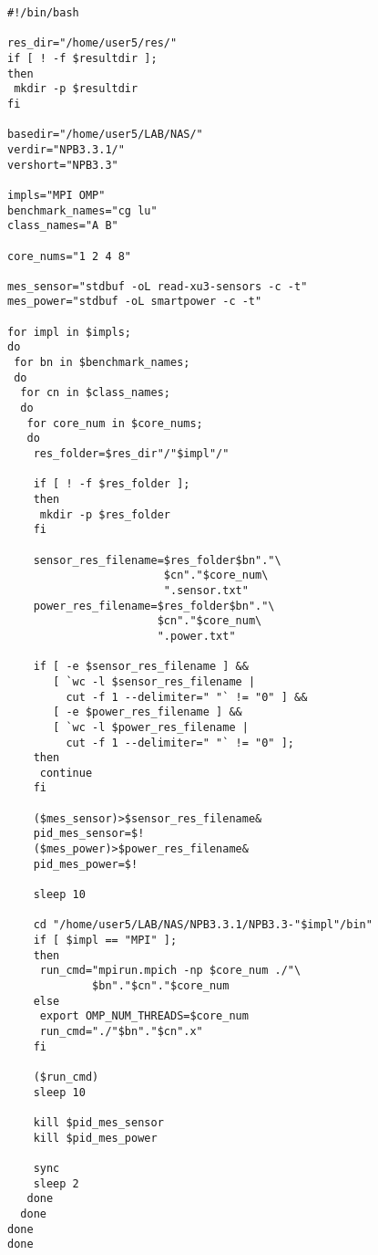\begin{lstlisting}[label=lst:meassure.sh, caption={meassure.sh}]
#!/bin/bash

res_dir="/home/user5/res/"
if [ ! -f $resultdir ];
then
 mkdir -p $resultdir
fi

basedir="/home/user5/LAB/NAS/"
verdir="NPB3.3.1/"
vershort="NPB3.3"

impls="MPI OMP"
benchmark_names="cg lu"
class_names="A B"

core_nums="1 2 4 8"

mes_sensor="stdbuf -oL read-xu3-sensors -c -t"
mes_power="stdbuf -oL smartpower -c -t"

for impl in $impls;
do
 for bn in $benchmark_names;
 do
  for cn in $class_names;
  do
   for core_num in $core_nums;
   do
    res_folder=$res_dir"/"$impl"/"
    
    if [ ! -f $res_folder ];
    then
     mkdir -p $res_folder
    fi
    
    sensor_res_filename=$res_folder$bn"."\
                        $cn"."$core_num\
                        ".sensor.txt"
    power_res_filename=$res_folder$bn"."\
                       $cn"."$core_num\
                       ".power.txt"
    
    if [ -e $sensor_res_filename ] && 
       [ `wc -l $sensor_res_filename | 
         cut -f 1 --delimiter=" "` != "0" ] && 
       [ -e $power_res_filename ] &&
       [ `wc -l $power_res_filename | 
         cut -f 1 --delimiter=" "` != "0" ];
    then
     continue
    fi
    
    ($mes_sensor)>$sensor_res_filename& 
    pid_mes_sensor=$!
    ($mes_power)>$power_res_filename&
    pid_mes_power=$!

    sleep 10 
    
    cd "/home/user5/LAB/NAS/NPB3.3.1/NPB3.3-"$impl"/bin"
    if [ $impl == "MPI" ];
    then
     run_cmd="mpirun.mpich -np $core_num ./"\
             $bn"."$cn"."$core_num
    else
     export OMP_NUM_THREADS=$core_num
     run_cmd="./"$bn"."$cn".x"
    fi
    
    ($run_cmd)
    sleep 10
    
    kill $pid_mes_sensor
    kill $pid_mes_power
    
    sync
    sleep 2
   done
  done
done
done
\end{lstlisting}

